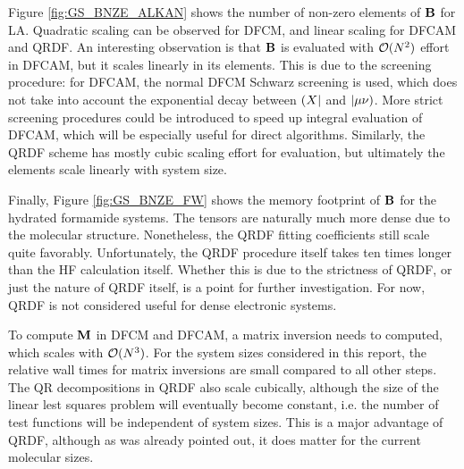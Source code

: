 Figure \ref{fig:GS_BNZE_ALKAN} shows the number of non-zero elements of $\mathbf{B}$ for LA. Quadratic scaling can be observed for DFCM, and linear scaling for DFCAM and QRDF. An interesting observation is that $\mathbf{B}$ is evaluated with $\mathcal{O}(N^{2})$ effort in DFCAM, but it scales linearly in its elements. This is due to the screening procedure: for DFCAM, the normal DFCM Schwarz screening is used, which does not take into account the exponential decay between $\left( X \right\rvert$ and $\left\lvert \mu\nu \right)$. More strict screening procedures could be introduced to speed up integral evaluation of DFCAM, which will be especially useful for direct algorithms. Similarly, the QRDF scheme has mostly cubic scaling effort for evaluation, but ultimately the elements scale linearly with system size. 

Finally, Figure \ref{fig:GS_BNZE_FW} shows the memory footprint of $\mathbf{B}$ for the hydrated formamide systems. The tensors are naturally much more dense due to the molecular structure. Nonetheless, the QRDF fitting coefficients still scale quite favorably. Unfortunately, the QRDF procedure itself takes ten times longer than the HF calculation itself. Whether this is due to the strictness of QRDF, or just the nature of QRDF itself, is a point for further investigation. For now, QRDF is not considered useful for dense electronic systems. 

To compute $\mathbf{M}$ in DFCM and DFCAM, a matrix inversion needs to computed, which scales with $\mathcal{O}(N^{3})$. For the system sizes considered in this report, the relative wall times for matrix inversions are small compared to all other steps. The QR decompositions in QRDF also scale cubically, although the size of the linear lest squares problem will eventually become constant, i.e. the number of test functions will be independent of system sizes. This is a major advantage of QRDF, although as was already pointed out, it does matter for the current molecular sizes.

